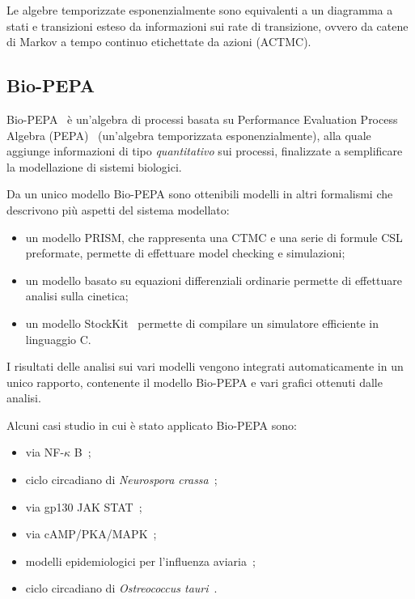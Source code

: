 	Le algebre temporizzate esponenzialmente sono equivalenti a un diagramma a stati e transizioni esteso da informazioni sui rate di transizione, ovvero da catene di Markov a tempo continuo etichettate da azioni (ACTMC).
		
		\subsection{Bio-PEPA}\label{sez:biopepa}
		Bio-PEPA~\cite{ciocchetta2009bio} \`e un'algebra di processi basata su Performance Evaluation Process Algebra (PEPA)~\cite{pepa} (un'algebra temporizzata esponenzialmente), alla quale aggiunge informazioni di tipo \emph{quantitativo} sui processi, finalizzate a semplificare la modellazione di sistemi biologici.
		
		Da un unico modello Bio-PEPA sono ottenibili modelli in altri formalismi che descrivono pi\`u aspetti del sistema modellato:
		\begin{itemize}
			\item un modello PRISM, che rappresenta una CTMC e una serie di formule CSL preformate, permette di effettuare model checking e simulazioni;
			\item un modello basato su equazioni differenziali ordinarie permette di effettuare analisi sulla cinetica;
			\item un modello StockKit~\cite{sanft2011stochkit2} permette di compilare un simulatore efficiente in linguaggio C.
		\end{itemize}
		I risultati delle analisi sui vari modelli vengono integrati automaticamente in un unico rapporto, contenente il modello Bio-PEPA e vari grafici ottenuti dalle analisi.
		
		Alcuni casi studio in cui \`e stato applicato Bio-PEPA sono:
		\begin{itemize}
			\item via NF-$\kappa$ B~\cite{ciocchetta2010modelling};
			\item ciclo circadiano di \emph{Neurospora crassa}~\cite{akman2009modelling};
			\item via gp130 JAK STAT~\cite{guerriero2009qualitative};
			\item via cAMP/PKA/MAPK~\cite{ciocchetta2009compartmental};
			\item modelli epidemiologici per l'influenza aviaria~\cite{ciocchetta2010bio};
			\item ciclo circadiano di \emph{Ostreococcus tauri}~\cite{akman2010complementary}.
		\end{itemize}
		
